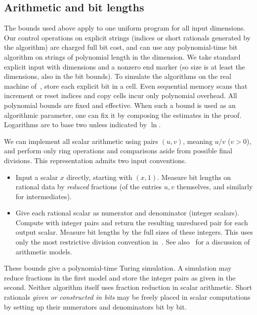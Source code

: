 \subsection{Arithmetic and bit lengths}\label{sec:arithmetic}

The bounds used above apply to one uniform program for all input dimensions.
Our control operations on explicit strings (indices or
short rationals generated by the algorithm)
are charged full bit cost, and can use any polynomial-time
bit algorithm on strings of polynomial length in the dimension.
We take standard explicit input with dimensions and a nonzero end marker
(so size is at least the dimensions, also in the bit bounds).
To simulate the algorithms on the real machine of~\cite{BSS}, store
each explicit bit in a cell. Even sequential memory scans that
increment or reset indices and copy cells incur only polynomial
overhead. All polynomial bounds are fixed and effective. When such a
bound is used as an algorithmic parameter, one can fix it by
composing the estimates in the proof.
Logarithms are to base two unless indicated by \(\ln\).

We can implement all scalar arithmetic using pairs
\((u,v)\), meaning \(u/v\) (\(v>0\)),
and perform only ring operations and comparisons aside from
possible final divisions.
This representation admits two input conventions.
\begin{itemize}
  \item Input a scalar \(x\) directly, starting with \((x,1)\).
    Measure bit lengths on rational data by \emph{reduced} fractions
    (of the entries \(u,v\) themselves, and similarly for intermediates).
  \item Give each rational scalar as numerator and denominator
    (integer scalars). Compute with integer pairs and return the
    resulting unreduced pair for each output scalar.
    Measure bit lengths by the full sizes of these integers.
    This uses only the most restrictive division convention
    in~\cite[\S1.3]{GLS}.
    See also~\cite{DKNOV} for a discussion of arithmetic models.
\end{itemize}
These bounds give a polynomial-time Turing simulation. A simulation
may reduce fractions in the first model and store the integer pairs as given
in the second. Neither algorithm
itself uses fraction reduction in scalar arithmetic. Short rationals \emph{given or constructed in
bits} may be freely placed in scalar computations by setting up their
numerators and denominators bit by bit.

